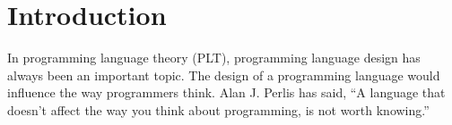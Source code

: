 \section{Introduction}

%
%


In programming language theory (PLT), programming language
design has always been an important topic.
The design of a programming language would influence the way programmers think.
Alan J. Perlis has said, “A language that doesn't affect the
way you think about programming, is not worth knowing.”


